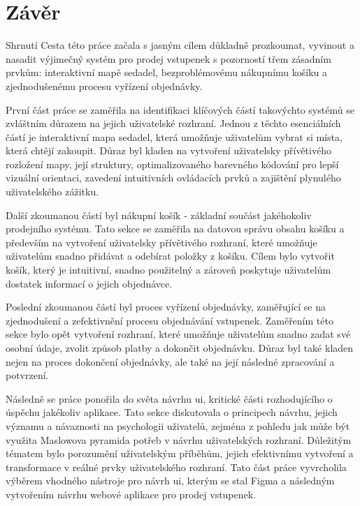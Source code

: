 \chapter*{Závěr}
\label{ch:zaver}

\begin{section}{Shrnutí}
    \label{sec:zaver-shrnuti}
    Cesta této práce začala s jasným cílem důkladně prozkoumat, vyvinout a nasadit výjimečný systém pro prodej vstupenek s pozorností třem zásadním prvkům: interaktivní mapě sedadel, bezproblémovému nákupnímu košíku a zjednodušenému procesu vyřízení objednávky.

    První část práce se zaměřila na identifikaci klíčových částí takovýchto systémů se zvláštním důrazem na jejich uživatelské rozhraní.
    Jednou z těchto esenciálních částí je interaktivní mapa sedadel, která umožňuje uživatelům vybrat si místa, která chtějí zakoupit.
    Důraz byl kladen na vytvoření uživatelsky přívětivého rozložení mapy, její struktury, optimalizovaného barevného kódování pro lepší vizuální orientaci, zavedení intuitivních ovládacích prvků a zajištění plynulého uživatelského zážitku.

    Další zkoumanou částí byl nákupní košík - základní součást jakéhokoliv prodejního systému.
    Tato sekce se zaměřila na datovou správu obsahu košíku a především na vytvoření uživatelsky přívětivého rozhraní, které umožňuje uživatelům snadno přidávat a odebírat položky z košíku.
    Cílem bylo vytvořit košík, který je intuitivní, snadno použitelný a zároveň poskytuje uživatelům dostatek informací o jejich objednávce.

    Poslední zkoumanou částí byl proces vyřízení objednávky, zaměřující se na zjednodušení a zefektivnění procesu objednávání vstupenek.
    Zaměřením této sekce bylo opět vytvoření rozhraní, které umožňuje uživatelům snadno zadat své osobní údaje, zvolit způsob platby a dokončit objednávku.
    Důraz byl také kladen nejen na proces dokončení objednávky, ale také na její následné zpracování a potvrzení.

    Následně se práce ponořila do světa návrhu \ac{ui}, kritické části rozhodujícího o úspěchu jakékoliv aplikace.
    Tato sekce diskutovala o principech návrhu, jejich významu a návaznosti na psychologii uživatelů, zejména z pohledu jak může být využita Maslowova pyramida potřeb v návrhu uživatelských rozhraní.
    Důležitým tématem bylo porozumění uživatelským příběhům, jejich efektivnímu vytvoření a transformace v reálné prvky uživatelského rozhraní.
    Tato část práce vyvrcholila výběrem vhodného nástroje pro návrh \ac{ui}, kterým se stal Figma a následným vytvořením návrhu webové aplikace pro prodej vstupenek.


\end{section}
